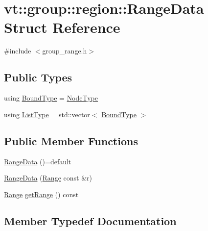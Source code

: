 \hypertarget{structvt_1_1group_1_1region_1_1_range_data}{}\section{vt\+:\+:group\+:\+:region\+:\+:Range\+Data Struct Reference}
\label{structvt_1_1group_1_1region_1_1_range_data}


{\ttfamily \#include $<$group\+\_\+range.\+h$>$}

\subsection*{Public Types}
\begin{DoxyCompactItemize}
\item 
using \hyperlink{structvt_1_1group_1_1region_1_1_range_data_a12ca75365c79bece7d169149b354011d}{Bound\+Type} = \hyperlink{namespacevt_a866da9d0efc19c0a1ce79e9e492f47e2}{Node\+Type}
\item 
using \hyperlink{structvt_1_1group_1_1region_1_1_range_data_a2450bd305df0f74edca0a864a3d21017}{List\+Type} = std\+::vector$<$ \hyperlink{structvt_1_1group_1_1region_1_1_range_data_a12ca75365c79bece7d169149b354011d}{Bound\+Type} $>$
\end{DoxyCompactItemize}
\subsection*{Public Member Functions}
\begin{DoxyCompactItemize}
\item 
\hyperlink{structvt_1_1group_1_1region_1_1_range_data_a8b5df2211262d2886fa3a1dbc915cbe3}{Range\+Data} ()=default
\item 
\hyperlink{structvt_1_1group_1_1region_1_1_range_data_a9b05605529f68b98c51a425921e038cd}{Range\+Data} (\hyperlink{structvt_1_1group_1_1region_1_1_range}{Range} const \&r)
\item 
\hyperlink{structvt_1_1group_1_1region_1_1_range}{Range} \hyperlink{structvt_1_1group_1_1region_1_1_range_data_a65d153d9024c2628e6f309abc28e2ffc}{get\+Range} () const
\end{DoxyCompactItemize}


\subsection{Member Typedef Documentation}
\mbox{\label{structvt_1_1group_1_1region_1_1_range_data_a12ca75365c79bece7d169149b354011d}} 
